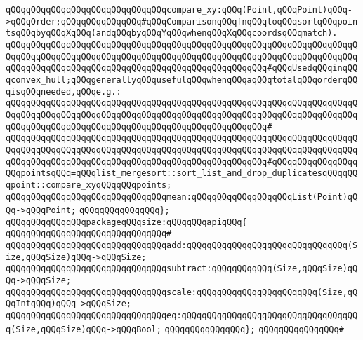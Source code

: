 \newline
\verb|qQQqqQQqqQQqqQQqqQQqqQQqqQQqqQQqcompare_xy:qQQq(Point,qQQqPoint)qQQq->qQQqOrder;qQQqqQQqqQQqqQQq#qQQqComparisonqQQqfnqQQqtoqQQqsortqQQqpointsqQQqbyqQQqXqQQq(andqQQqbyqQQqYqQQqwhenqQQqXqQQqcoordsqQQqmatch).|\newline
\verb|qQQqqQQqqQQqqQQqqQQqqQQqqQQqqQQqqQQqqQQqqQQqqQQqqQQqqQQqqQQqqQQqqQQqqQQqqQQqqQQqqQQqqQQqqQQqqQQqqQQqqQQqqQQqqQQqqQQqqQQqqQQqqQQqqQQqqQQqqQQqqQQqqQQqqQQqqQQqqQQqqQQqqQQqqQQqqQQqqQQqqQQqqQQqqQQq#qQQqUsedqQQqinqQQqconvex_hull;qQQqgenerallyqQQqusefulqQQqwhenqQQqaqQQqtotalqQQqorderqQQqisqQQqneeded,qQQqe.g.:|\newline
\verb|qQQqqQQqqQQqqQQqqQQqqQQqqQQqqQQqqQQqqQQqqQQqqQQqqQQqqQQqqQQqqQQqqQQqqQQqqQQqqQQqqQQqqQQqqQQqqQQqqQQqqQQqqQQqqQQqqQQqqQQqqQQqqQQqqQQqqQQqqQQqqQQqqQQqqQQqqQQqqQQqqQQqqQQqqQQqqQQqqQQqqQQqqQQqqQQq#|\newline
\verb|qQQqqQQqqQQqqQQqqQQqqQQqqQQqqQQqqQQqqQQqqQQqqQQqqQQqqQQqqQQqqQQqqQQqqQQqqQQqqQQqqQQqqQQqqQQqqQQqqQQqqQQqqQQqqQQqqQQqqQQqqQQqqQQqqQQqqQQqqQQqqQQqqQQqqQQqqQQqqQQqqQQqqQQqqQQqqQQqqQQqqQQqqQQqqQQq#qQQqqQQqqQQqqQQqqQQqpointsqQQq=qQQqlist_mergesort::sort_list_and_drop_duplicatesqQQqqQQqpoint::compare_xyqQQqqQQqpoints;|\newline
\verb|qQQqqQQqqQQqqQQqqQQqqQQqqQQqqQQqmean:qQQqqQQqqQQqqQQqqQQqList(Point)qQQq->qQQqPoint;|\newline
\verb|qQQqqQQqqQQqqQQq};|\newline
\newline
\newline
\verb|qQQqqQQqqQQqqQQqpackageqQQqsize:qQQqqQQqapiqQQq{|\newline
\verb|qQQqqQQqqQQqqQQqqQQqqQQqqQQqqQQq#|\newline
\verb|qQQqqQQqqQQqqQQqqQQqqQQqqQQqqQQqadd:qQQqqQQqqQQqqQQqqQQqqQQqqQQqqQQq(Size,qQQqSize)qQQq->qQQqSize;|\newline
\verb|qQQqqQQqqQQqqQQqqQQqqQQqqQQqqQQqsubtract:qQQqqQQqqQQq(Size,qQQqSize)qQQq->qQQqSize;|\newline
\verb|qQQqqQQqqQQqqQQqqQQqqQQqqQQqqQQqscale:qQQqqQQqqQQqqQQqqQQqqQQq(Size,qQQqIntqQQq)qQQq->qQQqSize;|\newline
\verb|qQQqqQQqqQQqqQQqqQQqqQQqqQQqqQQqeq:qQQqqQQqqQQqqQQqqQQqqQQqqQQqqQQqqQQq(Size,qQQqSize)qQQq->qQQqBool;|\newline
\verb|qQQqqQQqqQQqqQQq};|\newline
\verb|qQQqqQQqqQQqqQQq#|\newline
\newline
\newline
